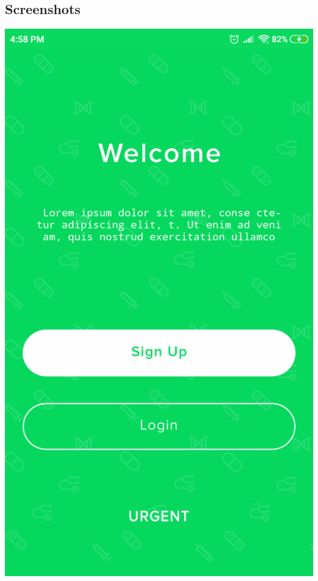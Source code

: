 \subsection{Screenshots}
\begin{center}
\includegraphics[scale=0.3]{img/Capture1.png}


\end{center}
